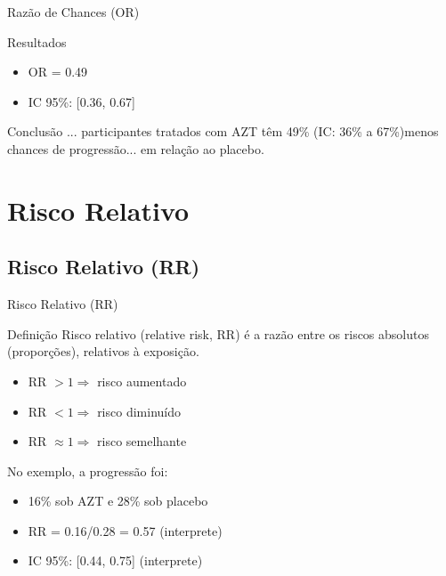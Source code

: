 \documentclass{beamer}
\begin{document}
\begin{frame}{\scriptsize Razão de Chances (OR)}
  \begin{exampleblock}{Resultados}
    \footnotesize
    \begin{itemize}
      \footnotesize
    \item OR = 0.49
    \item IC 95\%: [0.36, 0.67]
    \end{itemize}
  \end{exampleblock}

  \begin{exampleblock}{Conclusão}
    \footnotesize
    ... participantes tratados com AZT têm 49\% (IC: 36\% a 67\%)menos chances de progressão... em relação ao placebo.
  \end{exampleblock}
\end{frame}

\section{Risco Relativo}

\subsection{Risco Relativo (RR)}

\begin{frame}{\scriptsize Risco Relativo (RR)}
  \begin{block}{Definição}
    \footnotesize
    Risco relativo (relative risk, RR) é a razão entre os riscos absolutos (proporções), relativos à exposição.
  \end{block}
  \begin{itemize}
    \footnotesize
  \item RR $> 1 \Rightarrow$ risco aumentado
  \item RR $< 1 \Rightarrow$ risco diminuído
  \item RR $\approx 1 \Rightarrow$ risco semelhante
  \end{itemize}
  \begin{exampleblock}{No exemplo, a progressão foi:}
    \footnotesize
    \begin{itemize}
    \footnotesize
    \item 16\% sob AZT e 28\% sob placebo
    \item RR = 0.16/0.28 = 0.57 (interprete)
    \item<2-> IC 95\%: [0.44, 0.75] (interprete)
    \end{itemize}
  \end{exampleblock}
\end{frame}
\end{document}
